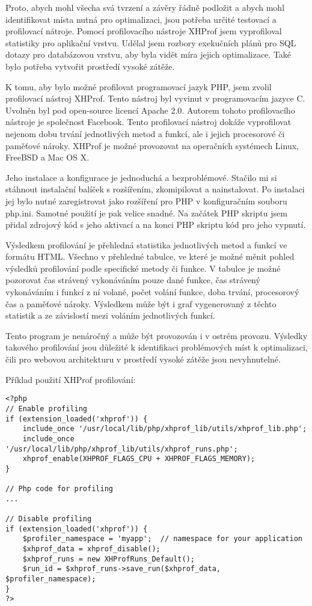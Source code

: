 \documentclass[12pt]{article}
\begin{document}
Proto, abych mohl všecha svá tvrzení a závěry řádně podložit a abych mohl identifikovat místa nutná pro optimalizaci, jsou potřeba určité testovací a profilovací nátroje. Pomocí profilovacího nástroje XHProf jsem vyprofiloval statistiky pro aplikační vrstvu. Udělal jsem rozbory exekučních plánů pro SQL dotazy pro databázovou vrstvu, aby byla vidět míra jejich optimalizace. Také bylo potřeba vytvořit prostředí vysoké zátěže.

K tomu, aby bylo možné profilovat programovací jazyk PHP, jsem zvolil profilovací nástroj XHProf. Tento nástroj byl vyvinut v programovacím jazyce C. Uvolněn byl pod open-source licencí Apache 2.0. Autorem tohoto profilovacího nástroje je společnost Facebook. Tento profilovací nástroj dokáže vyprofilovat nejenom dobu trvání jednotlivých metod a funkcí, ale i jejich procesorové či paměťové nároky. XHProf je možné provozovat na operačních systémech Linux, FreeBSD a Mac OS X.

Jeho instalace a konfigurace je jednoduchá a bezproblémové. Stačilo mi si stáhnout instalační balíček s rozšířením, zkomipilovat a nainstalovat. Po instalaci jej bylo nutné zaregistrovat jako rozšíření pro PHP v konfiguračním souboru php.ini. Samotné použití je pak velice snadné. Na začátek PHP skriptu jsem přidal zdrojový kód s jeho aktivací a na konci PHP skriptu kód pro jeho vypnutí.

Výsledkem profilování je přehledná statistika jednotlivých metod a funkcí ve formátu HTML. Všechno v přehledné tabulce, ve které je možné měnit pohled výsledků profilování podle specifické metody či funkce. V tabulce je možné pozorovat čas strávený vykonáváním pouze dané funkce, čas strávený vykonáváním i funkcí z ní volané, počet volání funkce, doba trvání, procesorový čas a paměťové nároky. Výsledkem může být i graf vygenerovaný z těchto statistik a ze závislostí mezi voláním jednotlivých funkcí.

Tento program je nenáročný a může být provozován i v ostrém provozu. Výsledky takového profilování jsou důležité k identifikaci problémových míst k optimalizaci, čili pro webovou architekturu v prostředí vysoké zátěže jsou nevyhnutelné.\cite{xhprof}

\newpage
Příklad použití XHProf profilování:
\begin{scriptsize}
\begin{verbatim}
<?php
// Enable profiling
if (extension_loaded('xhprof')) {
    include_once '/usr/local/lib/php/xhprof_lib/utils/xhprof_lib.php';
    include_once '/usr/local/lib/php/xhprof_lib/utils/xhprof_runs.php';
    xhprof_enable(XHPROF_FLAGS_CPU + XHPROF_FLAGS_MEMORY);
}

// Php code for profiling
...

// Disable profiling
if (extension_loaded('xhprof')) {
    $profiler_namespace = 'myapp';  // namespace for your application
    $xhprof_data = xhprof_disable();
    $xhprof_runs = new XHProfRuns_Default();
    $run_id = $xhprof_runs->save_run($xhprof_data, $profiler_namespace);
}
?>
\end{verbatim}
\end{scriptsize}
\end{document}
